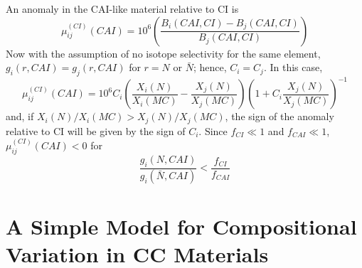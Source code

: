 \documentclass[preprint]{revtex4-2}
\begin{document}
An anomaly in the CAI-like material relative to CI is
\begin{equation}
\mu_{ij}^{(CI)}(CAI) = 10^6 \left(\frac{B_i(CAI, CI) - B_j(CAI, CI)}{B_j(CAI, CI)}\right)
\label{eq:mu_cai}
\end{equation}
Now with the assumption of no isotope selectivity for the same element,
$g_i(r, CAI) = g_j(r, CAI)$ for $r = N$ or $\bar{N}$; hence, $C_i = C_j$.
In this case,
\begin{equation}
\mu_{ij}^{(CI)}(CAI) = 10^6 C_i
\left(\frac{X_i(N)}{X_i(MC)} - \frac{X_j(N)}{X_j(MC)}\right)
\left(1 + C_i \frac{X_j(N)}{X_j(MC)}\right)^{-1}
\label{eq:mu_cai_prop}
\end{equation}
and, if $X_i(N)/X_i(MC) > X_j(N)/X_j(MC)$,
 the sign of the anomaly relative to CI will be given by the sign of $C_i$.
Since $f_{CI} \ll 1$ and $f_{CAI} \ll 1$,
$\mu_{ij}^{(CI)}(CAI) < 0$ for
\begin{equation}
\frac{g_i(N, CAI)}{g_i(\bar{N}, CAI)} < \frac{f_{CI}}{f_{CAI}}
\label{eq:ratio_cai}
\end{equation}

\section{A Simple Model for Compositional Variation in CC Materials}
\end{document}
